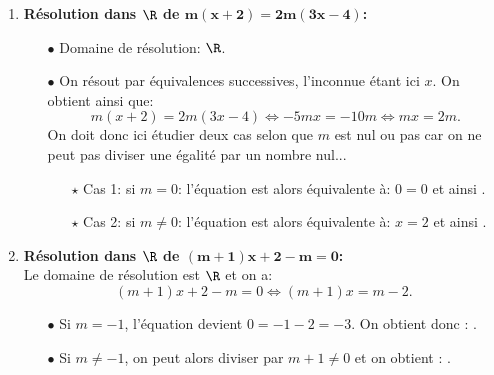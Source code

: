 \begin{correction} \;
\begin{enumerate}
\item \textbf{R\'esolution dans $\mathbf{\R}$ de $\mathbf{m(x+2)=2m(3x-4)}$:}\\
\noindent \begin{itemize}
\item[$\bullet$] Domaine de r\'esolution: $\R$.
\item[$\bullet$] On r\'esout par \'equivalences successives, l'inconnue \'etant ici $x$. On obtient ainsi que:
$$m(x+2)=2m(3x-4)\Leftrightarrow -5mx=-10m\Leftrightarrow mx=2m.$$
On doit donc ici \'etudier deux cas selon que $m$ est nul ou pas car on ne peut pas diviser une \'egalit\'e par un nombre nul...
\begin{itemize}
\item[$\star$] Cas 1: si $m=0$: l'\'equation est alors \'equivalente \`{a}: $0=0$ et ainsi .
\item[$\star$] Cas 2: si $m\not= 0$: l'\'equation est alors \'equivalente \`{a}: $x=2$ et ainsi .
\end{itemize}
\end{itemize}
\item \textbf{R\'esolution dans $\mathbf{\R}$ de $\mathbf{(m+1)x+2-m=0}$:}\\
\noindent Le domaine de r\'esolution est $\R$ et on a: 
$$(m+1)x+2-m=0\Leftrightarrow (m+1)x=m-2.$$
\begin{itemize}
 \item[$\bullet$]  Si $m=-1$, l'\'equation devient $0=-1-2=-3$. On obtient donc : .
\item[$\bullet$]  Si $m\not= -1$, on peut alors diviser par $m+1\not= 0$ et on obtient : .
\end{itemize}

\end{enumerate}
\end{correction}
